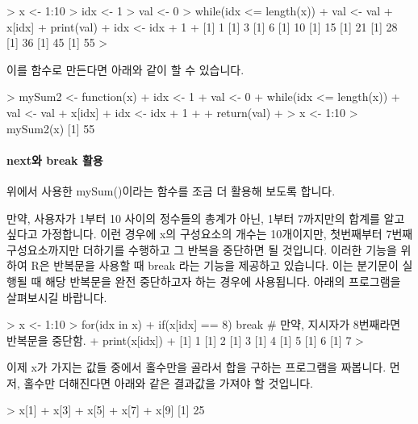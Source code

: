 \begin{Schunk}
\begin{Soutput}
> x <- 1:10
> idx <- 1
> val <- 0
> while(idx <= length(x)){
+ val <- val + x[idx]
+ print(val)
+ idx <- idx + 1
+ }
[1] 1
[1] 3
[1] 6
[1] 10
[1] 15
[1] 21
[1] 28
[1] 36
[1] 45
[1] 55
> 
\end{Soutput}
\end{Schunk}

이를 함수로 만든다면 아래와 같이 할 수 있습니다. 

\begin{Schunk}
\begin{Soutput}
> mySum2 <- function(x){
+ idx <- 1
+ val <- 0
+ while(idx <= length(x)){
+ val <- val + x[idx]
+ idx <- idx + 1
+ }
+ return(val)
+ }
> x <- 1:10
> mySum2(x)
[1] 55
\end{Soutput}
\end{Schunk}

\paragraph{next와 break 활용}

위에서 사용한 mySum()이라는 함수를 조금 더 활용해 보도록 합니다.

만약, 사용자가 1부터 10 사이의 정수들의 총계가 아닌, 1부터 7까지만의 합계를 알고 싶다고 가정합니다. 
이런 경우에 x의 구성요소의 개수는 10개이지만, 첫번째부터 7번째 구성요소까지만 더하기를 수행하고 그 반복을 중단하면 될 것입니다.
이러한 기능을 위하여 R은 반복문을 사용할 때 break 라는 기능을 제공하고 있습니다.
이는 분기문이 실행될 때 해당 반복문을 완전 중단하고자 하는 경우에 사용됩니다. 
아래의 프로그램을 살펴보시길 바랍니다. 

\begin{Schunk}
\begin{Soutput}
> x <- 1:10
> for(idx in x){
+ if(x[idx] == 8) break  # 만약, 지시자가 8번째라면 반복문을 중단함. 
+ print(x[idx])
+ }
[1] 1
[1] 2
[1] 3
[1] 4
[1] 5
[1] 6
[1] 7
> 
\end{Soutput}
\end{Schunk}

이제 x가 가지는 값들 중에서 홀수만을 골라서 합을 구하는 프로그램을 짜봅니다. 
먼저, 홀수만 더해진다면 아래와 같은 결과값을 가져야 할 것입니다. 

\begin{Schunk}
\begin{Soutput}
> x[1] + x[3] + x[5] + x[7] + x[9]
[1] 25
\end{Soutput}
\end{Schunk}

